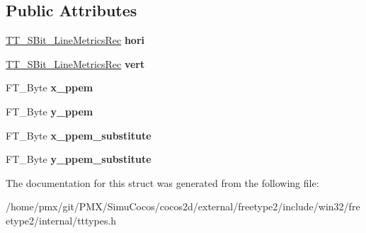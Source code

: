 \subsection*{Public Attributes}
\begin{DoxyCompactItemize}
\item 
\mbox{\label{structTT__SBit__ScaleRec___a2a61bc97ebb7ed996170a03612ffbbc0}} 
\hyperlink{structTT__SBit__LineMetricsRec__}{T\+T\+\_\+\+S\+Bit\+\_\+\+Line\+Metrics\+Rec} {\bfseries hori}
\item 
\mbox{\label{structTT__SBit__ScaleRec___acbf5c459602d9f52ac04a914e2f12375}} 
\hyperlink{structTT__SBit__LineMetricsRec__}{T\+T\+\_\+\+S\+Bit\+\_\+\+Line\+Metrics\+Rec} {\bfseries vert}
\item 
\mbox{\label{structTT__SBit__ScaleRec___a235731b0452ea063cccacd2f59b3f44c}} 
F\+T\+\_\+\+Byte {\bfseries x\+\_\+ppem}
\item 
\mbox{\label{structTT__SBit__ScaleRec___aa4c1fb419ea55c8c587ba81700c6ce66}} 
F\+T\+\_\+\+Byte {\bfseries y\+\_\+ppem}
\item 
\mbox{\label{structTT__SBit__ScaleRec___a71955e363b0b5da84ed2c15d0e6f832d}} 
F\+T\+\_\+\+Byte {\bfseries x\+\_\+ppem\+\_\+substitute}
\item 
\mbox{\label{structTT__SBit__ScaleRec___a3a9f554d0153f9e3022898c1f59a7b63}} 
F\+T\+\_\+\+Byte {\bfseries y\+\_\+ppem\+\_\+substitute}
\end{DoxyCompactItemize}


The documentation for this struct was generated from the following file\+:\begin{DoxyCompactItemize}
\item 
/home/pmx/git/\+P\+M\+X/\+Simu\+Cocos/cocos2d/external/freetype2/include/win32/freetype2/internal/tttypes.\+h\end{DoxyCompactItemize}
